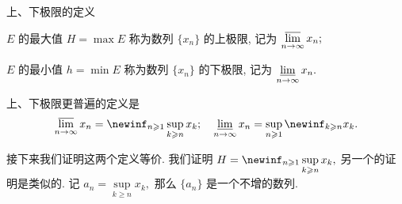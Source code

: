 
\begin{frame}{上、下极限的定义}

\begin{Def}
$E$ 的最大值 $H = \max E$ 称为数列 $\{x_n\}$ 的上极限, 记为 $\varlimsup\limits_{n\to\infty} x_n;$

$E$ 的最小值 $h = \min E$ 称为数列 $\{x_n\}$ 的下极限, 记为 $\varliminf\limits_{n\to\infty} x_n.$
\end{Def}

\pause
\vspace*{1em}

上、下极限更普遍的定义是
\begin{equation*}
\varlimsup_{n\to\infty} x_n = \newinf_{n \geqslant 1} \sup_{k \geqslant n} x_k; \quad \varliminf\limits_{n\to\infty} x_n = \sup_{n \geqslant 1} \newinf_{k \geqslant n} x_k.
\end{equation*}

\pause

接下来我们证明这两个定义等价. 我们证明 $\displaystyle H = \newinf_{n \geqslant 1} \sup_{k \geqslant n} x_k,$ 另一个的证明是类似的. 记 $a_n = \sup\limits_{k \geqslant n} x_k,$ 那么 $\{ a_n \}$ 是一个不增的数列.

\end{frame}


